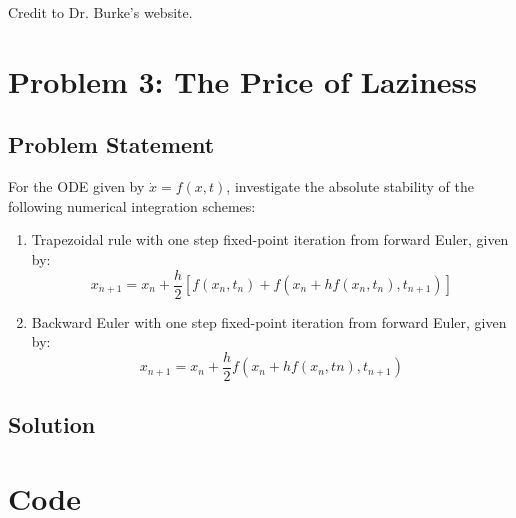 \documentclass[11pt]{report}
\theoremstyle{definition}
\begin{document}
\noindent
Credit to Dr. Burke's website\cite{Burke_2007}.

\newpage
\section*{Problem 3: The Price of Laziness}
\subsection*{Problem Statement}
For the ODE given by $\dot{x}=f(x,t)$, investigate the absolute stability of the
following numerical integration schemes:
\begin{enumerate}
	\item Trapezoidal rule with one step fixed-point iteration from forward Euler, given by:
	      \[x_{n+1}=x_n+\frac{h}{2}[f(x_n,t_n)+f(x_n+hf(x_n,t_n), t_{n+1})]\]
	\item Backward Euler with one step fixed-point iteration from forward Euler, given by:
	      \[x_{n+1}=x_n+\frac{h}{2}f(x_n+hf(x_n,tn),t_{n+1})\]
\end{enumerate}

\subsection*{Solution}

\newpage
\section*{Code}
\lstset{style=mystyle}


\newpage
\printbibliography

\end{document}
